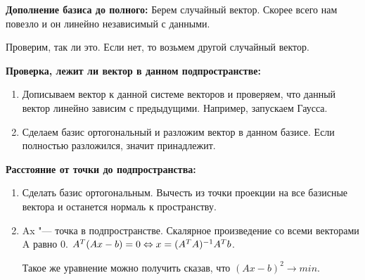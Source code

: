 \textbf{Дополнение базиса до полного:}
Берем случайный вектор. Скорее всего нам повезло и 
он линейно независимый с данными. 

Проверим, так ли это. Если нет, то возьмем другой случайный вектор. 

\textbf{Проверка, лежит ли вектор в данном подпространстве:} 
\begin{enumerate}
    \item Дописываем вектор к данной системе векторов и проверяем, что данный вектор
    линейно зависим с предыдущими. Например, запускаем Гаусса. 
    \item Сделаем базис ортогональный и разложим вектор в данном базисе. Если полностью разложился, 
    значит принадлежит.
\end{enumerate}

\textbf{Расстояние от точки до подпространства:}
\begin{enumerate}
    \item Сделать базис ортогональным. Вычесть из точки проекции
    на все базисные вектора и останется нормаль к пространству.
    \item Ax "--- точка в подпространстве. Скалярное произведение со всеми 
    векторами A равно 0. $A^T(Ax - b) = 0 \Leftrightarrow x = (A^TA)^{-1}A^Tb$.

    Такое же уравнение можно получить сказав, что $(Ax - b)^2 \to min$.
\end{enumerate}